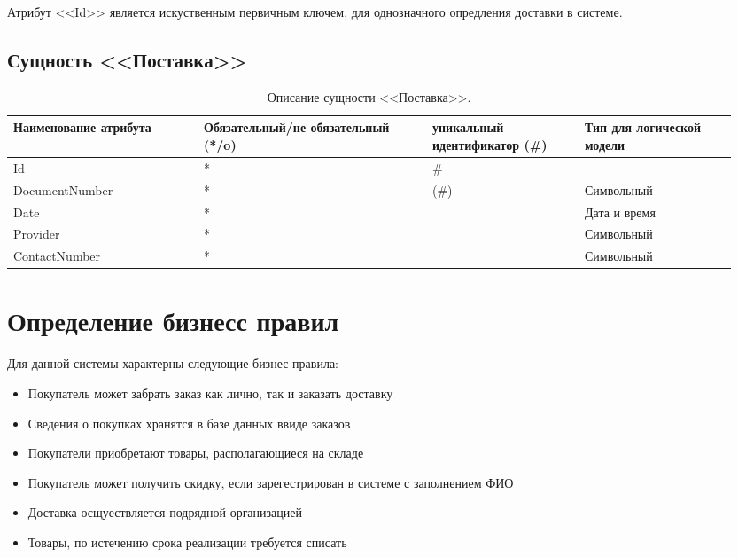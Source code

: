 \documentclass[14pt]{extreport}
\begin{document}
        Атрибут <<Id>> является искуственным первичным ключем, для однозначного опредления доставки в системе.
    
    \subsection*{Сущность <<Поставка>>}

        \begin{table}[H]
            \begin{tabular}{|p{0.25\linewidth}|p{0.3\linewidth}|p{0.2\linewidth}|p{0.2\linewidth}|}
                \hline
                Наименование атрибута & Обязательный/не обязательный (*/o) & уникальный идентификатор (\#) & Тип для логической модели
                \\ \hline
                Id & * & \# & \\ \hline
                DocumentNumber & * & (\#) & Символьный\\ \hline
                Date & * & & Дата и время \\ \hline
                Provider & * & & Символьный \\ \hline
                ContactNumber & * & & Символьный \\ \hline
            \end{tabular}
            \caption{Описание сущности <<Поставка>>.}
        \end{table}
    
    \section{Определение бизнесс правил}

    Для данной системы характерны следующие бизнес-правила:
    \begin{itemize}
        \item Покупатель может забрать заказ как лично, так и заказать доставку
        \item Сведения о покупках хранятся в базе данных ввиде заказов
        \item Покупатели приобретают товары, располагающиеся на складе
        \item Покупатель может получить скидку, если зарегестрирован в системе с заполнением ФИО
        \item Доставка осщуествляется подрядной организацией
        \item Товары, по истечению срока реализации требуется списать
    \end{itemize}
    
\end{document}
